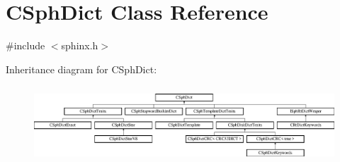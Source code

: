 \hypertarget{classCSphDict}{\section{C\-Sph\-Dict Class Reference}
\label{classCSphDict}
}


{\ttfamily \#include $<$sphinx.\-h$>$}

Inheritance diagram for C\-Sph\-Dict\-:\begin{figure}[H]
\begin{center}
\leavevmode
\includegraphics[height=2.931937cm]{classCSphDict}
\end{center}
\end{figure}
